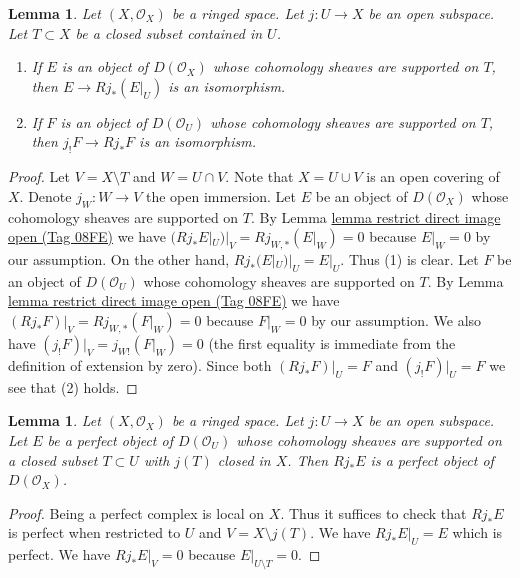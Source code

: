 \documentclass{amsart}
\theoremstyle{plain}
\newtheorem{lemma}[subsection]{Lemma}
\theoremstyle{definition}
\theoremstyle{remark}
\numberwithin{equation}{subsection}
\begin{document}
\begin{lemma}
\label{cohomology-lemma-pushforward-restriction}
Let $(X, \mathcal{O}_X)$ be a ringed space. Let $j : U \to X$ be an
open subspace. Let $T \subset X$ be a closed subset contained in $U$.
\begin{enumerate}
\item If $E$ is an object of $D(\mathcal{O}_X)$ whose cohomology sheaves
are supported on $T$, then $E \to Rj_*(E|_U)$ is an isomorphism.
\item If $F$ is an object of $D(\mathcal{O}_U)$ whose cohomology sheaves
are supported on $T$, then $j_!F \to Rj_*F$ is an isomorphism.
\end{enumerate}
\end{lemma}

\begin{proof}
Let $V = X \setminus T$ and $W = U \cap V$. Note that $X = U \cup V$ is an
open covering of $X$. Denote $j_W : W \to V$ the open immersion.
Let $E$ be an object of $D(\mathcal{O}_X)$ whose cohomology sheaves are
supported on $T$. By
Lemma \href{https://stacks.math.columbia.edu/tag/08FE}{lemma restrict direct image open (Tag 08FE)} we have
$(Rj_*E|_U)|_V = Rj_{W, *}(E|_W) = 0$ because $E|_W = 0$ by our assumption.
On the other hand, $Rj_*(E|_U)|_U = E|_U$. Thus (1) is clear.
Let $F$ be an object of $D(\mathcal{O}_U)$ whose cohomology sheaves
are supported on $T$. By
Lemma \href{https://stacks.math.columbia.edu/tag/08FE}{lemma restrict direct image open (Tag 08FE)} we have
$(Rj_*F)|_V = Rj_{W, *}(F|_W) = 0$ because $F|_W = 0$ by our assumption.
We also have $(j_!F)|_V = j_{W!}(F|_W) = 0$ (the first equality is immediate
from the definition of extension by zero). Since both
$(Rj_*F)|_U = F$ and $(j_!F)|_U = F$ we see that (2) holds.
\end{proof}


\begin{lemma}
\label{cohomology-lemma-pushforward-perfect}
Let $(X, \mathcal{O}_X)$ be a ringed space. Let $j : U \to X$ be an
open subspace. Let $E$ be a perfect object of $D(\mathcal{O}_U)$
whose cohomology
sheaves are supported on a closed subset $T \subset U$ with $j(T)$
closed in $X$. Then $Rj_*E$ is a perfect object of $D(\mathcal{O}_X)$.
\end{lemma}

\begin{proof}
Being a perfect complex is local on $X$. Thus it suffices to check that
$Rj_*E$ is perfect when restricted to $U$ and $V = X \setminus j(T)$.
We have $Rj_*E|_U = E$ which is perfect. We have
 $Rj_*E|_V = 0$ because $E|_{U \setminus T} = 0$.
\end{proof}
\end{document}
